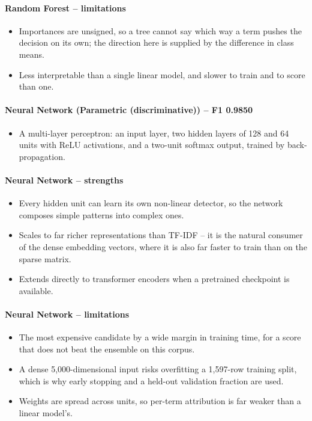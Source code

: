 \documentclass[conference,a4paper]{IEEEtran}
\begin{document}
\paragraph{Random Forest -- limitations}

\begin{itemize}
  \item Importances are unsigned, so a tree cannot say which way a term pushes the decision on its own; the direction here is supplied by the difference in class means.
  \item Less interpretable than a single linear model, and slower to train and to score than one.
\end{itemize}

\paragraph{Neural Network (Parametric (discriminative)) -- F1 0.9850}

\begin{itemize}
  \item A multi-layer perceptron: an input layer, two hidden layers of 128 and 64 units with ReLU activations, and a two-unit softmax output, trained by back-propagation.
\end{itemize}

\paragraph{Neural Network -- strengths}

\begin{itemize}
  \item Every hidden unit can learn its own non-linear detector, so the network composes simple patterns into complex ones.
  \item Scales to far richer representations than TF-IDF -- it is the natural consumer of the dense embedding vectors, where it is also far faster to train than on the sparse matrix.
  \item Extends directly to transformer encoders when a pretrained checkpoint is available.
\end{itemize}

\paragraph{Neural Network -- limitations}

\begin{itemize}
  \item The most expensive candidate by a wide margin in training time, for a score that does not beat the ensemble on this corpus.
  \item A dense 5,000-dimensional input risks overfitting a 1,597-row training split, which is why early stopping and a held-out validation fraction are used.
  \item Weights are spread across units, so per-term attribution is far weaker than a linear model's.
\end{itemize}
\end{document}
